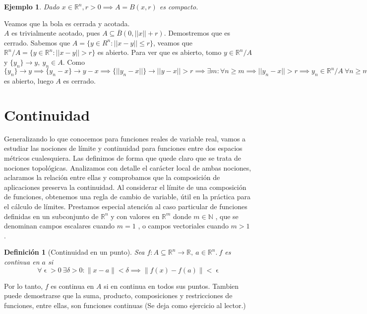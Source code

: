 \documentclass[11pt, a4paper]{article}
\makeatletter
\newif\IfInSansMode
\let\oldsf\sffamily
\renewcommand*{\sffamily}{\oldsf\mathversion{sans}\InSansModetrue}
\let\oldnorm\normalfont
\renewcommand*{\normalfont}{\oldnorm\InSansModefalse\mathversion{normal}}
\let\epsilon\upvarepsilon
\newcommand{\R}{\mathbb{R}} \newcommand{\N}{\mathbb{N}}
\renewenvironment{proof}[1][\proofname] {\par\pushQED{\qed}\normalfont\topsep6\p@\@plus6\p@\relax\trivlist\item[\hskip\labelsep\itshape\sffamily#1\@addpunct{.}]\ignorespaces}{\popQED\endtrivlist\@endpefalse}
\theoremstyle{theorem-style}
\theoremstyle{definition-style}
\newtheorem{ndef}{Definición}[section]
\theoremstyle{remark-style}
\theoremstyle{example-style}
\newtheorem{ejemplo}{Ejemplo}[section]
\makeatother
\begin{document}
\begin{ejemplo}
Dado $x \in \R^n, r > 0 \implies A = B(x,r)$ es compacto.
\end{ejemplo}

\begin{proof}
	Veamos que la bola es cerrada y acotada. \\
	$A$ es trivialmente acotado, pues $A \subseteq \overline{B}(0, ||x||+r).$ Demostremos que es cerrado. Sabemos que $A = \{y \in R^n: ||x-y|| \le r\}$, veamos que $ \R^n/A = \{y \in \R^n: ||x-y||>r\}$ es abierto. Para ver que es abierto, tomo $y \in \R^n/A$ y $ \{y_n\} \rightarrow y, \ y_n \in A$. Como $\{y_n\} \rightarrow y \implies \{y_n-x\} \rightarrow y - x \implies \{||y_n-x||\} \rightarrow ||y - x|| > r \implies \exists m: \forall n \ge m \implies ||y_n-x||>r \implies y_n \in \R^n/A \ \forall n \ge m \implies \R^n/A$ es abierto, luego $A$ es cerrado.
\end{proof}


\section{Continuidad}

Generalizando lo que conocemos para funciones reales de variable real, vamos a estudiar
las nociones de límite y continuidad para funciones entre dos espacios métricos cualesquiera.
Las definimos de forma que quede claro que se trata de nociones topológicas. Analizamos con
detalle el carácter local de ambas nociones, aclaramos la relación entre ellas y comprobamos
que la composición de aplicaciones preserva la continuidad. Al considerar el límite de una
composición de funciones, obtenemos una regla de cambio de variable, útil en la práctica para
el cálculo de límites. Prestamos especial atención al caso particular de funciones definidas en un
subconjunto de $\R^n$ y con valores en $\R^m$ donde $m \in \N$ , que se denominan campos escalares
cuando $m = 1$ , o campos vectoriales cuando $m > 1$ .

\begin{ndef}[Continuidad en un punto]
Sea $f: A \subseteq \R^n \to \R, \ a \in \R^n. \ f $ es continua en $a$ si $$ \forall \epsilon > 0 \ \exists \delta > 0: \|x-a\| < \delta \implies \|f(x)-f(a)\| < \epsilon$$
\end{ndef}

Por lo tanto, $f$ es continua en $A$ si en continua en todos sus puntos. Tambien puede demostrarse que la suma, producto, composiciones y restricciones de funciones, entre ellas, son funciones continuas (Se deja como ejercicio al lector.)
\end{document}

